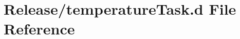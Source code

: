 \hypertarget{temperature_task_8d}{}\section{Release/temperature\+Task.d File Reference}
\label{temperature_task_8d}
